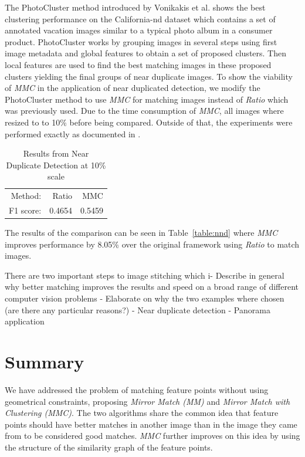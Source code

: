 \documentclass{article}
\begin{document}
The PhotoCluster method introduced by Vonikakis et al.  
\cite{vas2013cluster} shows the best clustering performance on the 
California-nd dataset \cite{jinda2012california} which contains a set of
annotated vacation images similar to a typical photo album in a consumer
product. PhotoCluster works by grouping images in several steps using 
first image metadata and global features to obtain a set of proposed 
clusters. Then local features are used to find the best matching images 
in these proposed clusters yielding the final groups of near duplicate 
images. To show the viability of \emph{MMC} in the application of near 
duplicated detection, we modify the PhotoCluster method to use 
\emph{MMC} for matching images instead of \emph{Ratio} which was 
previously used. Due to the time consumption of \emph{MMC}, all images 
where resized to to 10\% before being compared. Outside of that, the 
experiments were performed exactly as documented in 
\cite{vas2013cluster}.

\begin{table}[htb]
\caption{Results from Near Duplicate Detection at 10\% scale}
\label{table:ndd}
	\centering
\begin{tabular}{r*{2}{r}}
\hline
    Method: & Ratio & MMC   \\
	\noalign{\smallskip}
    F1 score: & 0.4654 & 0.5459 \\
	\hline
\end{tabular}
\end{table}

The results of the comparison can be seen in Table~\ref{table:nnd} where
\emph{MMC} improves performance by 8.05\% over the original framework 
using \emph{Ratio} to match images.



There are two important steps to image stitching which i- Describe in 
general why better matching improves the results and speed on a broad 
range of different computer vision problems
 - Elaborate on why the two examples where chosen (are there any 
 particular reasons?)
 - Near duplicate detection
 - Panorama application

\section{Summary}
\label{S:Summary}

We have addressed the problem of matching feature points without using 
geometrical constraints, proposing \emph{Mirror Match 
(MM)} and \emph{Mirror Match with Clustering (MMC)}.  The two algorithms 
share the common idea that feature points should have better 
matches in another image than in the image they came from to be 
considered good matches.  \emph{MMC} further improves on this idea by 
using the structure of the similarity graph of the feature points. 
\end{document}
